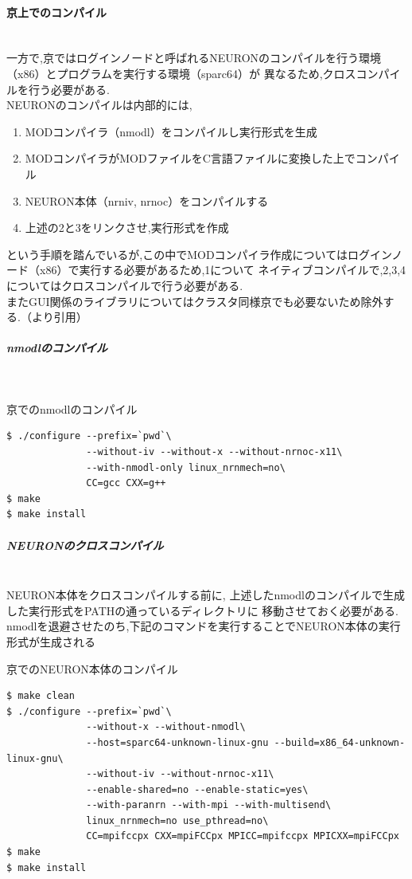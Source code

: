 \paragraph{京上でのコンパイル}~\\
一方で,京ではログインノードと呼ばれるNEURONのコンパイルを行う環境（x86）とプログラムを実行する環境（sparc64）が
異なるため,クロスコンパイルを行う必要がある.\\
NEURONのコンパイルは内部的には,
\begin{enumerate}
\item MODコンパイラ（nmodl）をコンパイルし実行形式を生成
\item MODコンパイラがMODファイルをC言語ファイルに変換した上でコンパイル
\item NEURON本体（nrniv, nrnoc）をコンパイルする
\item 上述の2と3をリンクさせ,実行形式を作成
\end{enumerate}
という手順を踏んでいるが,この中でMODコンパイラ作成についてはログインノード（x86）で実行する必要があるため,1について
ネイティブコンパイルで,2,3,4についてはクロスコンパイルで行う必要がある.\\
またGUI関係のライブラリについてはクラスタ同様京でも必要ないため除外する.（\cite{miyamoto-master}より引用）\\
\subparagraph{nmodlのコンパイル}~\\
\begin{table}[htb]
  \caption {京でのnmodlのコンパイル}
{\footnotesize
\begin{framed}
\begin{verbatim}
$ ./configure --prefix=`pwd`\
              --without-iv --without-x --without-nrnoc-x11\
              --with-nmodl-only linux_nrnmech=no\
              CC=gcc CXX=g++
$ make
$ make install
\end{verbatim}
\end{framed}
}
\end{table}

\subparagraph{NEURONのクロスコンパイル}~\\
NEURON本体をクロスコンパイルする前に, 上述したnmodlのコンパイルで生成した実行形式をPATHの通っているディレクトリに
移動させておく必要がある. nmodlを退避させたのち,下記のコマンドを実行することでNEURON本体の実行形式が生成される

\begin{table}[htb]
  \caption {京でのNEURON本体のコンパイル}
{\footnotesize
\begin{framed}
\begin{verbatim}
$ make clean
$ ./configure --prefix=`pwd`\
              --without-x --without-nmodl\
              --host=sparc64-unknown-linux-gnu --build=x86_64-unknown-linux-gnu\
              --without-iv --without-nrnoc-x11\
              --enable-shared=no --enable-static=yes\
              --with-paranrn --with-mpi --with-multisend\
              linux_nrnmech=no use_pthread=no\
              CC=mpifccpx CXX=mpiFCCpx MPICC=mpifccpx MPICXX=mpiFCCpx
$ make
$ make install
\end{verbatim}
\end{framed}
}
\end{table}
